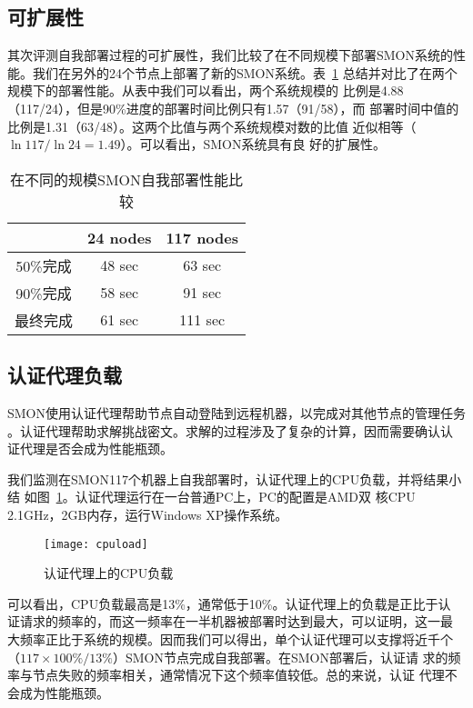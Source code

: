 
\subsection{可扩展性}

其次评测自我部署过程的可扩展性，我们比较了在不同规模下部署SMON系统的性
能。我们在另外的24个节点上部署了新的SMON系统。表~\ref{fig:scalability}
总结并对比了在两个规模下的部署性能。从表中我们可以看出，两个系统规模的
比例是4.88（117/24），但是90\%进度的部署时间比例只有1.57（91/58），而
部署时间中值的比例是1.31（63/48）。这两个比值与两个系统规模对数的比值
近似相等（$\ln 117/\ln 24 = 1.49$）。可以看出，SMON系统具有良
好的扩展性。

\begin{table}
\centering
  \begin{minipage}{0.8\linewidth}
    \centering
    \caption{在不同的规模SMON自我部署性能比较}
    \label{fig:scalability}
    \begin{tabular}{ccc}
    \toprule[1.5pt]
           & 24 nodes & 117 nodes\\
    \midrule[1pt]
    50\%完成 & 48 sec & 63 sec \\
    90\%完成 & 58 sec & 91 sec\\
    最终完成 & 61 sec & 111 sec\\
    \bottomrule[1.5pt]
    \end{tabular}
  \end{minipage}
\end{table}

\subsection{认证代理负载}

SMON使用认证代理帮助节点自动登陆到远程机器，以完成对其他节点的管理任务
。认证代理帮助求解挑战密文。求解的过程涉及了复杂的计算，因而需要确认认
证代理是否会成为性能瓶颈。

我们监测在SMON117个机器上自我部署时，认证代理上的CPU负载，并将结果小结
如图~\ref{fig:agentload}。认证代理运行在一台普通PC上，PC的配置是AMD双
核CPU 2.1GHz，2GB内存，运行Windows XP操作系统。

\begin{figure}
\centering
\texttt{[image: cpuload]}
\caption{认证代理上的CPU负载}
\label{fig:agentload}
\end{figure}

可以看出，CPU负载最高是13\%，通常低于10\%。认证代理上的负载是正比于认
证请求的频率的，而这一频率在一半机器被部署时达到最大，可以证明，这一最
大频率正比于系统的规模。因而我们可以得出，单个认证代理可以支撑将近千个
（$117 \times 100\%/13\%$）SMON节点完成自我部署。在SMON部署后，认证请
求的频率与节点失败的频率相关，通常情况下这个频率值较低。总的来说，认证
代理不会成为性能瓶颈。

